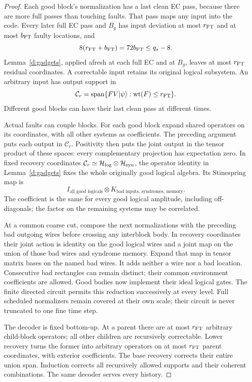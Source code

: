 \begin{proof}
Each good block's normalization has a last clean EC pass, because
there are more full passes than touching faults. That pass maps any
input into the code. Every later full EC pass and \(B_g\) has input
deviation at most \(r_{\rm FT}\) and at most \(b_{\rm FT}\) faulty
locations, and
\[
 8(r_{\rm FT}+b_{\rm FT})=72b_{\rm FT}\le q_s-8.
\]
Lemma~\ref{d:gadgets}, applied afresh at each full EC and at \(B_g\),
leaves at most \(r_{\rm FT}\) residual coordinates. A correctable
input retains its original logical subsystem. An arbitrary input has
output support in
\[
 \mathcal C_{r}=\operatorname{span}
       \{FV|\psi\rangle:\mathrm{wt}(F)\le r_{\rm FT}\}.
\]
Different good blocks can have their last clean pass at different times.

Actual faults can couple blocks. For each good block expand shared
operators on its coordinates, with all other systems as coefficients.
The preceding argument puts each output in \(\mathcal C_r\).
Positivity then puts the joint output in the tensor product of these
spaces: every complementary projection has expectation zero. In fixed
recovery coordinates \(\mathcal C_r\simeq\mathcal H_{\rm log}
\otimes\mathcal H_{\rm syn}\), the operator identity in
Lemma~\ref{d:gadgets} fixes the whole originally good logical algebra.
Its Stinespring map is
\[
 I_{\text{all good logicals}}\otimes
       K_{\text{bad inputs, syndromes, memory}}.
\]
The coefficient is the same for every good logical amplitude, including
off-diagonals; the factor on the remaining systems may be correlated.

At a common coarse cut, compose the next normalizations with the
preceding bad outgoing wires before crossing any interblock body.
In recovery coordinates their joint action is identity on the good
logical wires and a joint map on the union of those bad wires and
syndrome memory. Expand that map in tensor matrix bases on the named
bad wires. It adds neither a wire nor a bad location. Consecutive bad
rectangles can remain distinct; their common environment coefficients
are allowed. Good bodies now implement their ideal logical gates.
The finite directed circuit permits this reduction successively at
every level. Full scheduled normalizers remain covered at their own
scale; their circuit is never truncated to one fine time step.

The decoder is fixed bottom-up. At a parent there
are at most \(r_{\rm FT}\) arbitrary child-block operators; all other
children are recursively correctable. Lower recovery turns the former
into arbitrary operators on at most \(r_{\rm FT}\) parent coordinates,
with exterior coefficients. The base recovery corrects their entire
union span. Induction corrects all recursively allowed supports and
their coherent combinations. The same decoder serves every history.
\end{proof}

